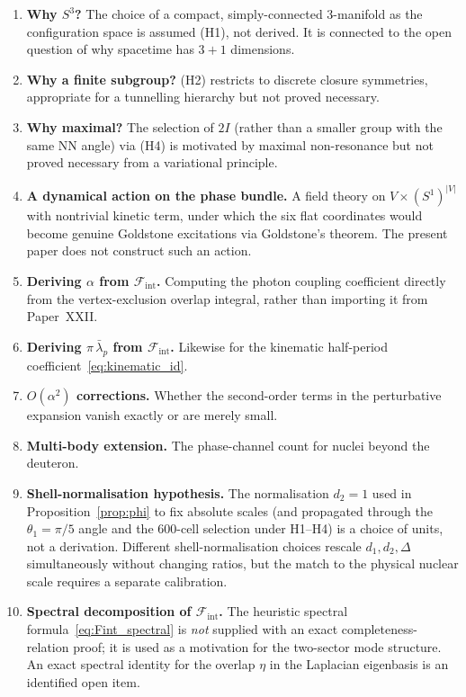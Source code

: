 \documentclass[12pt]{article}
\newcommand{\Fcal}{\mathcal{F}}
\newcommand{\Fint}{\Fcal_{\mathrm{int}}}
\newcommand{\lbar}{\bar{\lambda}}
\begin{document}
\begin{enumerate}
    \item \textbf{Why $S^3$?} The choice of a compact, simply-connected 3-manifold as the configuration space is assumed (H1), not derived. It is connected to the open question of why spacetime has $3+1$ dimensions.
    \item \textbf{Why a finite subgroup?} (H2) restricts to discrete closure symmetries, appropriate for a tunnelling hierarchy but not proved necessary.
    \item \textbf{Why maximal?} The selection of $2I$ (rather than a smaller group with the same NN angle) via (H4) is motivated by maximal non-resonance but not proved necessary from a variational principle.
    \item \textbf{A dynamical action on the phase bundle.} A field theory on $V \times (S^1)^{|V|}$ with nontrivial kinetic term, under which the six flat coordinates would become genuine Goldstone excitations via Goldstone's theorem. The present paper does not construct such an action.
    \item \textbf{Deriving $\alpha$ from $\Fint$.} Computing the photon coupling coefficient directly from the vertex-exclusion overlap integral, rather than importing it from Paper~XXII.
    \item \textbf{Deriving $\pi\,\lbar_p$ from $\Fint$.} Likewise for the kinematic half-period coefficient~\eqref{eq:kinematic_id}.
    \item \textbf{$O(\alpha^2)$ corrections.} Whether the second-order terms in the perturbative expansion vanish exactly or are merely small.
    \item \textbf{Multi-body extension.} The phase-channel count for nuclei beyond the deuteron.
    \item \textbf{Shell-normalisation hypothesis.} The normalisation $d_2 = 1$ used in Proposition~\ref{prop:phi} to fix absolute scales (and propagated through the $\theta_1 = \pi/5$ angle and the 600-cell selection under H1--H4) is a choice of units, not a derivation. Different shell-normalisation choices rescale $d_1, d_2, \Delta$ simultaneously without changing ratios, but the match to the physical nuclear scale requires a separate calibration.
    \item \textbf{Spectral decomposition of $\Fint$.} The heuristic spectral formula~\eqref{eq:Fint_spectral} is \emph{not} supplied with an exact completeness-relation proof; it is used as a motivation for the two-sector mode structure. An exact spectral identity for the overlap $\eta$ in the Laplacian eigenbasis is an identified open item.

\end{enumerate}
\end{document}
